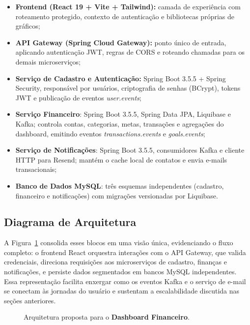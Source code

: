 \begin{itemize}
    \item \textbf{Frontend (React 19 + Vite + Tailwind):} camada de experiência com roteamento protegido, contexto de autenticação e bibliotecas próprias de gráficos;
    \item \textbf{API Gateway (Spring Cloud Gateway):} ponto único de entrada, aplicando autenticação JWT, regras de CORS e roteando chamadas para os demais microserviços;
    \item \textbf{Serviço de Cadastro e Autenticação:} Spring Boot 3.5.5 + Spring Security, responsável por usuários, criptografia de senhas (BCrypt), tokens JWT e publicação de eventos \textit{user.events};
    \item \textbf{Serviço Financeiro}: Spring Boot 3.5.5, Spring Data JPA, Liquibase e Kafka; controla contas, categorias, metas, transações e agregações do dashboard, emitindo eventos \textit{transactions.events} e \textit{goals.events};
    \item \textbf{Serviço de Notificações}: Spring Boot 3.5.5, consumidores Kafka e cliente HTTP para Resend; mantém o cache local de contatos e envia e\hyp mails transacionais;
    \item \textbf{Banco de Dados MySQL}: três esquemas independentes (cadastro, financeiro e notificações) com migrações versionadas por Liquibase.
\end{itemize}

\subsection{Diagrama de Arquitetura}

A Figura~\ref{fig:arquitetura} consolida esses blocos em uma visão única, evidenciando o fluxo completo: o frontend React orquestra interações com o API Gateway, que valida credenciais, direciona requisições aos microserviços de cadastro, finanças e notificações, e persiste dados segmentados em bancos MySQL independentes. Essa representação facilita enxergar como os eventos Kafka e o serviço de e-mail se conectam às jornadas do usuário e sustentam a escalabilidade discutida nas seções anteriores.

\begin{figure}[H]
\centering
{}
\caption{Arquitetura proposta para o \textbf{Dashboard Financeiro}.}
\label{fig:arquitetura}
\end{figure}

